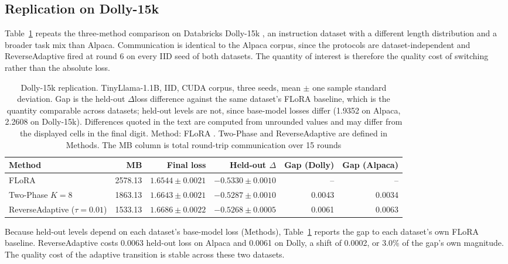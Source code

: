 \documentclass[pdflatex,sn-nature,lineno]{sn-jnl}
\begin{document}
\subsection{Replication on Dolly-15k}
\label{sec:dolly}
Table~\ref{tab:dolly} repeats the three-method comparison on Databricks Dolly-15k \cite{dolly2023}, an instruction dataset with a different length distribution and a broader task mix than Alpaca. Communication is identical to the Alpaca corpus, since the protocols are dataset-independent and ReverseAdaptive fired at round 6 on every IID seed of both datasets. The quantity of interest is therefore the quality cost of switching rather than the absolute loss.

\begin{table}[!htbp]
\centering
\footnotesize
\setlength{\tabcolsep}{6pt}
\caption{Dolly-15k replication. TinyLlama-1.1B, IID, CUDA corpus, three seeds, mean $\pm$ one sample standard deviation. Gap is the held-out $\Delta$loss difference against the same dataset's FLoRA baseline, which is the quantity comparable across datasets; held-out levels are not, since base-model losses differ (1.9352 on Alpaca, 2.2608 on Dolly-15k). Differences quoted in the text are computed from unrounded values and may differ from the displayed cells in the final digit. Method: FLoRA \cite{wang2024flora}. Two-Phase and ReverseAdaptive are defined in Methods. The MB column is total round-trip communication over 15 rounds}
\label{tab:dolly}
\begin{tabular}{@{}lrrrrr@{}}
\toprule
Method & MB & Final loss & Held-out $\Delta$ & Gap (Dolly) & Gap (Alpaca) \\
\midrule
FLoRA                           & 2578.13 & $1.6544 \pm 0.0021$ & $-0.5330 \pm 0.0010$ & -- & -- \\
Two-Phase $K{=}8$               & 1863.13 & $1.6643 \pm 0.0021$ & $-0.5287 \pm 0.0010$ & 0.0043 & 0.0034 \\
ReverseAdaptive ($\tau{=}0.01$) & 1533.13 & $1.6686 \pm 0.0022$ & $-0.5268 \pm 0.0005$ & 0.0061 & 0.0063 \\
\bottomrule
\end{tabular}
\end{table}

Because held-out levels depend on each dataset's base-model loss (Methods), Table~\ref{tab:dolly} reports the gap to each dataset's own FLoRA baseline. ReverseAdaptive costs 0.0063 held-out loss on Alpaca and 0.0061 on Dolly, a shift of 0.0002, or 3.0\% of the gap's own magnitude. The quality cost of the adaptive transition is stable across these two datasets.
\end{document}
